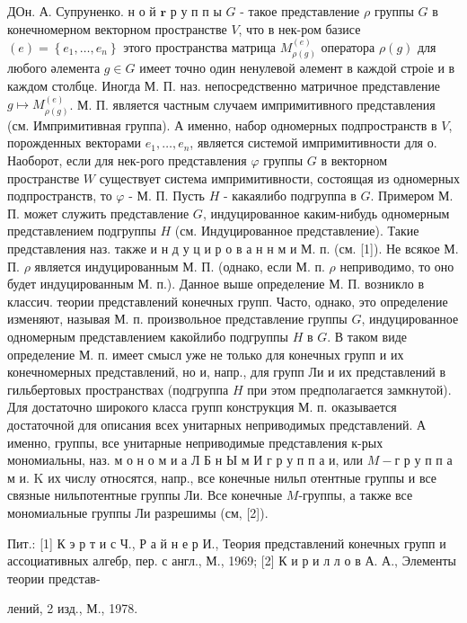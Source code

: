 \documentclass[10pt]{article}
\begin{document}
ДОн. А. Супруненко. н о й $\boldsymbol{r}$ р у п п ы $G$ - такое представление $\rho$ группы $G$ в конечномерном векторном пространстве $V$, что в нек-ром базисе $(e)=\left\{e_{1}, \ldots, e_{n}\right\}$ этого пространства матрица $M_{\rho(g)}^{(e)}$ оператора $\rho(g)$ для любого әлемента $g \in G$ имеет точно один ненулевой әлемент в каждой строіе и в каждом столбце. Иногда М. П. наз. непосредственно матричное представление $g \longmapsto M_{\rho(g)}^{(e)}$. М. П. является частным случаем импримитивного представления (см. Импримитивная группа). А именно, набор одномерных подпространств в $V$, порожденных векторами $e_{1}, \ldots, e_{n}$, является системой импримитивности для $о$. Наоборот, если для нек-рого представления $\varphi$ группы $G$ в векторном пространстве $W$ существует система импримитивности, состоящая из одномерных подпространств, то $\varphi$ - М. П. Пусть $H$ - какаялибо подгруппа в $G$. Примером М. П. может служить представление $G$, индуцированное каким-нибудь одномерным представлением подгруппы $H$ (см. Индуцированное представление). Такие представления наз. также и н д у ц и р о в а н н м и М. п. (см. [1]). Не всякое М. П. $\rho$ является индуцированным М. П. (однако, если М. п. $\rho$ неприводимо, то оно будет индуцированным М. п.). Данное выше определение М. П. возникло в классич. теории представлений конечных групп. Часто, однако, это определение изменяют, называя М. п. произвольное представление группы $G$, индуцированное одномерным представлением какойлибо подгруппы $H$ в $G$. В таком виде определение М. п. имеет смысл уже не только для конечных групп и их конечномерных представлений, но и, напр., для групп Ли и их представлений в гильбертовых пространствах (подгруппа $H$ при этом предполагается замкнутой). Для достаточно широкого класса групп конструкция М. п. оказывается достаточной для описания всех унитарных неприводимых представлений. А именно, группы, все унитарные неприводимые представления к-рых мономиальны, наз. м о н о м и а Л Б н Ы м И г р у п п а и, или $M-г$ р у п п а м и. $\mathrm{K}$ их числу относятся, напр., все конечные нильп отентные группы и все связные нильпотентные группы Ли. Все конечные $M$-группы, а также все мономиальные группы Ли разрешимы (см, [2]).



Пит.: [1] К э р т и с Ч., Р а й н е р И., Теория представлений конечных групп и ассоциативных алгебр, пер. с англ., М., 1969; [2] К и р и л л о в А. А., Элементы теории представ-

лений, 2 изд., М., 1978.
\end{document}
